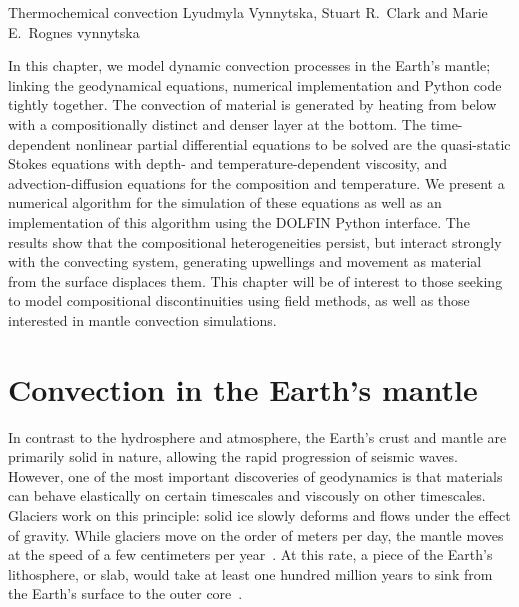               {Thermochemical convection}
              {Lyudmyla Vynnytska,  Stuart R.~Clark and Marie E.~Rognes}
              {vynnytska}

In this chapter, we model dynamic convection processes in the Earth's
mantle; linking the geodynamical equations, numerical implementation and
Python code tightly together. The convection of material is generated by
heating from below with a compositionally distinct and denser layer at
the bottom.  The time-dependent nonlinear partial differential equations
to be solved are the quasi-static Stokes equations with depth- and
temperature-dependent viscosity, and advection-diffusion equations for
the composition and temperature.  We present a numerical algorithm for
the simulation of these equations as well as an implementation of this
algorithm using the DOLFIN Python interface.  The results show that the
compositional heterogeneities persist, but interact strongly with the
convecting system, generating upwellings and movement as material from
the surface displaces them. This chapter will be of interest to those
seeking to model compositional discontinuities using field methods,
as well as those interested in mantle convection simulations.

\section{Convection in the Earth's mantle}

In contrast to the hydrosphere and atmosphere, the Earth's crust and
mantle are primarily solid in nature, allowing the rapid progression
of seismic waves.  However, one of the most important discoveries
of geodynamics is that materials can behave elastically on certain
timescales and viscously on other timescales. Glaciers work on this
principle: solid ice slowly deforms and flows under the effect of gravity.
While glaciers move on the order of meters per day, the mantle moves
at the speed of a few centimeters per year~\citep{vanderMeer2010}.
At this rate, a piece of the Earth's lithosphere, or slab, would take
at least one hundred million years to sink from the Earth's surface to
the outer core~\citep{Jarvis2007}.


